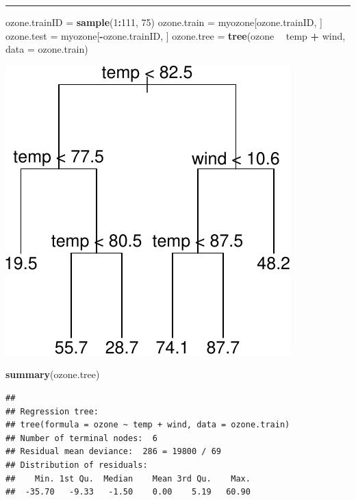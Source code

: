 \documentclass[]{article}
\newenvironment{Shaded}{\begin{snugshade}}{\end{snugshade}}
\newcommand{\DataTypeTok}[1]{\textcolor[rgb]{0.13,0.29,0.53}{#1}}
\newcommand{\DecValTok}[1]{\textcolor[rgb]{0.00,0.00,0.81}{#1}}
\newcommand{\KeywordTok}[1]{\textcolor[rgb]{0.13,0.29,0.53}{\textbf{#1}}}
\newcommand{\NormalTok}[1]{#1}
\newcommand{\OperatorTok}[1]{\textcolor[rgb]{0.81,0.36,0.00}{\textbf{#1}}}
\newcommand{\StringTok}[1]{\textcolor[rgb]{0.31,0.60,0.02}{#1}}
\begin{document}
\begin{center}\rule{0.5\linewidth}{\linethickness}\end{center}

\footnotesize

\begin{Shaded}
\begin{Highlighting}[]
\NormalTok{ozone.trainID =}\StringTok{ }\KeywordTok{sample}\NormalTok{(}\DecValTok{1}\OperatorTok{:}\DecValTok{111}\NormalTok{, }\DecValTok{75}\NormalTok{)}
\NormalTok{ozone.train =}\StringTok{ }\NormalTok{myozone[ozone.trainID, ]}
\NormalTok{ozone.test =}\StringTok{ }\NormalTok{myozone[}\OperatorTok{-}\NormalTok{ozone.trainID, ]}
\NormalTok{ozone.tree =}\StringTok{ }\KeywordTok{tree}\NormalTok{(ozone }\OperatorTok{~}\StringTok{ }\NormalTok{temp }\OperatorTok{+}\StringTok{ }\NormalTok{wind, }\DataTypeTok{data =}\NormalTok{ ozone.train)}
\end{Highlighting}
\end{Shaded}

\includegraphics{8Trees_files/figure-latex/unnamed-chunk-6-1.pdf}

\begin{Shaded}
\begin{Highlighting}[]
\KeywordTok{summary}\NormalTok{(ozone.tree)}
\end{Highlighting}
\end{Shaded}

\begin{verbatim}
## 
## Regression tree:
## tree(formula = ozone ~ temp + wind, data = ozone.train)
## Number of terminal nodes:  6 
## Residual mean deviance:  286 = 19800 / 69 
## Distribution of residuals:
##    Min. 1st Qu.  Median    Mean 3rd Qu.    Max. 
##  -35.70   -9.33   -1.50    0.00    5.19   60.90
\end{verbatim}
\end{document}
